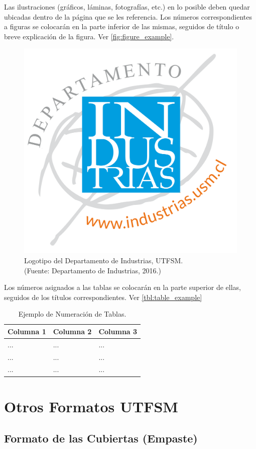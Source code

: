 \begin{description}
Las ilustraciones (gráficos, láminas, fotografías, etc.) en lo posible deben quedar ubicadas dentro de la página que se les referencia. Los números correspondientes a figuras se colocarán en la parte inferior de las mismas, seguidos de título o breve explicación de la figura. Ver \autoref{fig:figure_example}.
	\begin{figure}[ht!]
	\centering
	\includegraphics[width=.3\textwidth]{figures/logoind.png}
	
	\caption[Logotipo del Departamento de Industrias, UTFSM.]{Logotipo del Departamento de Industrias, UTFSM.\\
	{\footnotesize (Fuente: Departamento de Industrias, 2016.)}}
	
	\label{fig:figure_example}
	\end{figure}

Los números asignados a las tablas se colocarán en la parte superior de ellas, seguidos de los títulos correspondientes. Ver \autoref{tbl:table_example}

\begin{table}[ht]
    \centering
    \caption[Ejemplo: Numeración de Tablas]{Ejemplo de Numeración de Tablas.}
    \begin{tabular}{@{}p{3cm}|p{3cm}|p{3cm}@{}}
        \toprule
        \textbf{Columna 1} & \textbf{Columna 2} & \textbf{Columna 3} \\
        \hline\hline
        ... & ... & ... \\
        \hline
        ... & ... & ... \\
        \hline
        ... & ... & ... \\
        \bottomrule
    \end{tabular}
    \label{tbl:table_example}
\end{table}

\end{description}

\section{Otros Formatos UTFSM}
\subsection{Formato de las Cubiertas (Empaste)}

